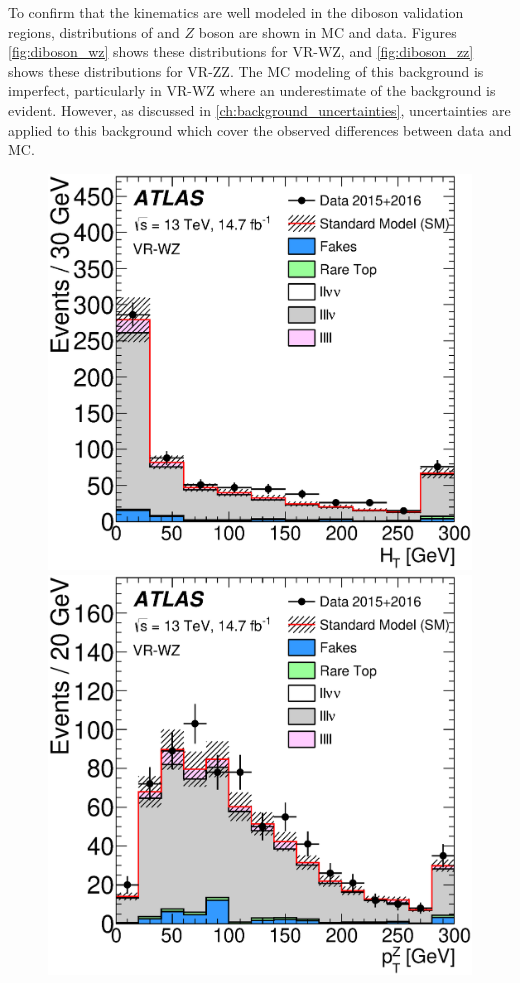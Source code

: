To confirm that the kinematics are well modeled in the diboson validation regions, distributions of \HT and $Z$ boson \pt are shown in \ac{MC} and data. Figures \ref{fig:diboson_wz} shows these distributions for VR-WZ, and \autoref{fig:diboson_zz} shows these distributions for VR-ZZ. The \ac{MC} modeling of this background is imperfect, particularly in VR-WZ where an underestimate of the background is evident. However, as discussed in \autoref{ch:background_uncertainties}, uncertainties are applied to this background which cover the observed differences between data and \ac{MC}.


\begin{centering}
\begin{figure}[htbp]
\centering
\includegraphics[width=.9\textwidth]{figures/dibosons/figaux_11a.eps}
\includegraphics[width=.9\textwidth]{figures/dibosons/figaux_11b.eps}

\end{figure}
\end{centering}
